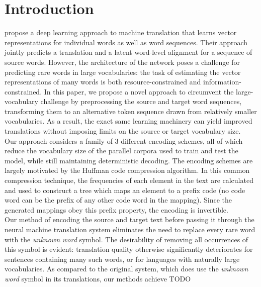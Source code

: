\section{Introduction}
\label{sec:intro}

 propose a deep learning approach to
machine translation that learns vector representations for individual words as
well as word sequences. Their approach jointly predicts a translation and a
latent word-level alignment for a sequence of source words. However, the architecture of
the network poses a challenge for predicting rare words in large
vocabularies: the task of estimating the vector representations of many words
is both resource-constrained and information-constrained. In this paper, we
propose a novel approach to circumvent the large-vocabulary challenge by preprocessing the source
and target word sequences, transforming them to an alternative token sequence drawn from
relatively smaller vocabularies. As a result, the exact same learning machinery
can yield improved translations without imposing limits on the source or target
vocabulary size.\\

Our approach considers a family of 3 different encoding schemes, all of which
reduce the vocabulary size of the parallel corpora used to train and test the model,
while still maintaining deterministic decoding. The encoding schemes are largely
motivated by the Huffman code compression algorithm. In this common compression technique,
the frequencies of each element in the text are calculated and used to construct a tree
which maps an element to a prefix code (no code word can be the prefix of any other code
word in the mapping). Since the generated mappings obey this prefix property, the
encoding is invertible.\\

Our method of encoding the source and target text before passing it through the
neural machine translation system eliminates the need to replace every rare word with the
\emph{unknown word} symbol. The desirability of removing all occurrences of this symbol is evident: translation
quality otherwise significantly deteriorates for sentences containing many such words, or for
languages with naturally large vocabularies. As compared to the original system, which does use
the \emph{unknown word} symbol in its translations, our methods achieve TODO